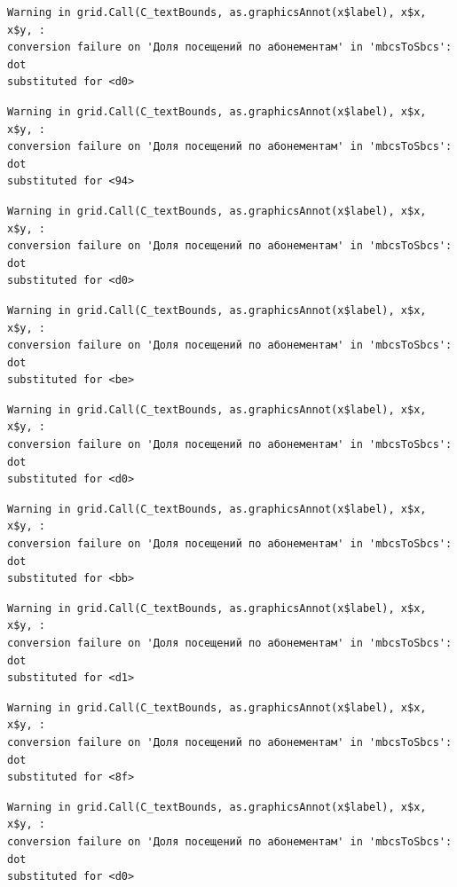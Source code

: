 \documentclass[
  letterpaper,
  DIV=11,
  numbers=noendperiod]{scrartcl}
\begin{document}
\begin{verbatim}
Warning in grid.Call(C_textBounds, as.graphicsAnnot(x$label), x$x, x$y, :
conversion failure on 'Доля посещений по абонементам' in 'mbcsToSbcs': dot
substituted for <d0>
\end{verbatim}

\begin{verbatim}
Warning in grid.Call(C_textBounds, as.graphicsAnnot(x$label), x$x, x$y, :
conversion failure on 'Доля посещений по абонементам' in 'mbcsToSbcs': dot
substituted for <94>
\end{verbatim}

\begin{verbatim}
Warning in grid.Call(C_textBounds, as.graphicsAnnot(x$label), x$x, x$y, :
conversion failure on 'Доля посещений по абонементам' in 'mbcsToSbcs': dot
substituted for <d0>
\end{verbatim}

\begin{verbatim}
Warning in grid.Call(C_textBounds, as.graphicsAnnot(x$label), x$x, x$y, :
conversion failure on 'Доля посещений по абонементам' in 'mbcsToSbcs': dot
substituted for <be>
\end{verbatim}

\begin{verbatim}
Warning in grid.Call(C_textBounds, as.graphicsAnnot(x$label), x$x, x$y, :
conversion failure on 'Доля посещений по абонементам' in 'mbcsToSbcs': dot
substituted for <d0>
\end{verbatim}

\begin{verbatim}
Warning in grid.Call(C_textBounds, as.graphicsAnnot(x$label), x$x, x$y, :
conversion failure on 'Доля посещений по абонементам' in 'mbcsToSbcs': dot
substituted for <bb>
\end{verbatim}

\begin{verbatim}
Warning in grid.Call(C_textBounds, as.graphicsAnnot(x$label), x$x, x$y, :
conversion failure on 'Доля посещений по абонементам' in 'mbcsToSbcs': dot
substituted for <d1>
\end{verbatim}

\begin{verbatim}
Warning in grid.Call(C_textBounds, as.graphicsAnnot(x$label), x$x, x$y, :
conversion failure on 'Доля посещений по абонементам' in 'mbcsToSbcs': dot
substituted for <8f>
\end{verbatim}

\begin{verbatim}
Warning in grid.Call(C_textBounds, as.graphicsAnnot(x$label), x$x, x$y, :
conversion failure on 'Доля посещений по абонементам' in 'mbcsToSbcs': dot
substituted for <d0>
\end{verbatim}
\end{document}
